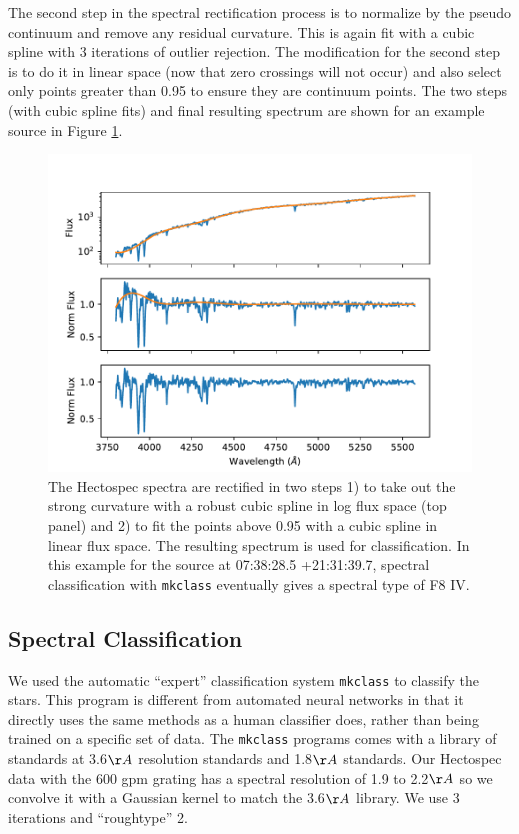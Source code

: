 \documentclass{aastex6}
\begin{document}
The second step in the spectral rectification process is to normalize by the pseudo continuum and remove any residual curvature.
This is again fit with a cubic spline with 3 iterations of outlier rejection.
The modification for the second step is to do it in linear space (now that zero crossings will not occur) and also select only points greater than 0.95 to ensure they are continuum points.
The two steps (with cubic spline fits) and final resulting spectrum are shown for an example source in Figure \ref{fig:SpecRect}.

\begin{figure}[!hbtp]
\centering
\includegraphics[width=.7\columnwidth]{images/O_0738284_p2131_spec.pdf}
\caption{The Hectospec spectra are rectified in two steps 1) to take out the strong curvature with a robust cubic spline in log flux space (top panel) and 2) to fit the points above 0.95 with a cubic spline in linear flux space.
The resulting spectrum is used for classification.
In this example for the source at 07:38:28.5 +21:31:39.7, spectral classification with \texttt{mkclass} eventually gives a spectral type of F8 IV.}\label{fig:SpecRect}
\end{figure}

\subsection{Spectral Classification}

We used the automatic ``expert'' classification system \texttt{mkclass} \citep{gray2014classification} to classify the stars.
This program is different from automated neural networks in that it directly uses the same methods as a human classifier does, rather than being trained on a specific set of data.
The \texttt{mkclass} programs comes with a library of standards at 3.6$\AA$ resolution standards and 1.8$\AA$ standards.
Our Hectospec data with the 600 gpm grating has a spectral resolution of 1.9 to 2.2$\AA$ so we convolve it with a Gaussian kernel to match the 3.6$\AA$ library.
We use 3 iterations and ``roughtype'' 2.
\end{document}
